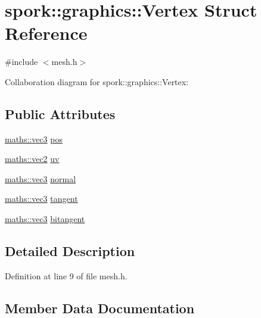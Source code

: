 \hypertarget{structspork_1_1graphics_1_1_vertex}{}\section{spork\+:\+:graphics\+:\+:Vertex Struct Reference}
\label{structspork_1_1graphics_1_1_vertex}


{\ttfamily \#include $<$mesh.\+h$>$}



Collaboration diagram for spork\+:\+:graphics\+:\+:Vertex\+:
\subsection*{Public Attributes}
\begin{DoxyCompactItemize}
\item 
\hyperlink{structspork_1_1maths_1_1vec3}{maths\+::vec3} \hyperlink{structspork_1_1graphics_1_1_vertex_a575f427175d550b166c926bf10b5b91b}{pos}
\item 
\hyperlink{structspork_1_1maths_1_1vec2}{maths\+::vec2} \hyperlink{structspork_1_1graphics_1_1_vertex_a6819c06c407580090fbef90a86241d30}{uv}
\item 
\hyperlink{structspork_1_1maths_1_1vec3}{maths\+::vec3} \hyperlink{structspork_1_1graphics_1_1_vertex_a2cf54fd42944046bcd9ef0b5d465305f}{normal}
\item 
\hyperlink{structspork_1_1maths_1_1vec3}{maths\+::vec3} \hyperlink{structspork_1_1graphics_1_1_vertex_a91af1dc87bf4b673d9744bc59a753e87}{tangent}
\item 
\hyperlink{structspork_1_1maths_1_1vec3}{maths\+::vec3} \hyperlink{structspork_1_1graphics_1_1_vertex_a50f0fccc7a64c8b516a9c74f31ddbd6f}{bitangent}
\end{DoxyCompactItemize}


\subsection{Detailed Description}


Definition at line 9 of file mesh.\+h.



\subsection{Member Data Documentation}
\mbox{\label{structspork_1_1graphics_1_1_vertex_a50f0fccc7a64c8b516a9c74f31ddbd6f}} 
